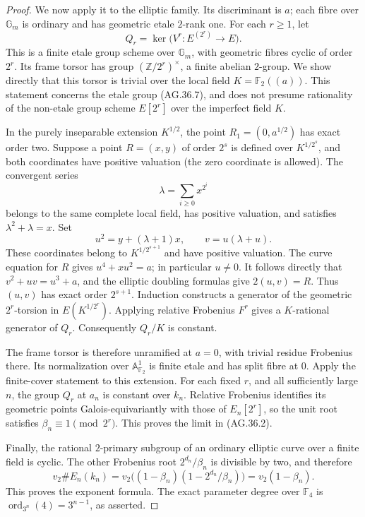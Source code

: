 \begin{proof}
We now apply it to the elliptic family. Its discriminant is
\(a\); each fibre over \(\mathbb G_m\) is ordinary and
has geometric etale \(2\)-rank one. For each \(r\geq1\),
let
\[
 Q_r=\ker\bigl(V^r:E^{(2^r)}\longrightarrow E\bigr).
 \tag{AG.36.7}
\]
This is a finite etale group scheme over \(\mathbb G_m\),
with geometric fibres cyclic of order \(2^r\). Its frame
torsor has group \((\mathbb Z/2^r)^\times\), a finite
abelian \(2\)-group. We show directly that this torsor is
trivial over the local field \(K=\mathbb F_2((a))\).
This statement concerns the etale group (AG.36.7), and does
not presume rationality of the non-etale group scheme
\(E[2^r]\) over the imperfect field \(K\).

In the purely inseparable extension \(K^{1/2}\), the point
\(R_1=(0,a^{1/2})\) has exact order two. Suppose a point
\(R=(x,y)\) of order \(2^s\) is defined over
\(K^{1/2^s}\), and both coordinates have positive valuation
(the zero coordinate is allowed). The convergent series
\[
                  \lambda=\sum_{i\geq0}x^{2^i}
 \tag{AG.36.8}
\]
belongs to the same complete local field, has positive
valuation, and satisfies \(\lambda^2+\lambda=x\).
Set
\[
 u^2=y+(\lambda+1)x,\qquad v=u(\lambda+u).
 \tag{AG.36.9}
\]
These coordinates belong to \(K^{1/2^{s+1}}\) and have
positive valuation. The curve equation for \(R\) gives
\(u^4+xu^2=a\); in particular \(u\ne0\).
It follows directly that \(v^2+uv=u^3+a\), and the
elliptic doubling formulas give \(2(u,v)=R\).
Thus \((u,v)\) has exact order \(2^{s+1}\).
Induction constructs a generator of the geometric
\(2^r\)-torsion in \(E(K^{1/2^r})\).
Applying relative Frobenius \(F^r\) gives a \(K\)-rational
generator of \(Q_r\). Consequently \(Q_r/K\) is constant.

The frame torsor is therefore unramified at \(a=0\),
with trivial residue Frobenius there. Its normalization over
\(\mathbb A^1_{\mathbb F_2}\) is finite etale and has split
fibre at \(0\). Apply the finite-cover statement to this
extension. For each fixed \(r\), and all sufficiently large
\(n\), the group \(Q_r\) at \(a_n\) is constant over
\(k_n\). Relative Frobenius identifies its geometric points
Galois-equivariantly with those of \(E_n[2^r]\), so the
unit root satisfies \(\beta_n\equiv1\pmod{2^r}\).
This proves the limit in (AG.36.2).

Finally, the rational \(2\)-primary subgroup of an ordinary
elliptic curve over a finite field is cyclic. The other
Frobenius root \(2^{d_n}/\beta_n\) is divisible by two,
and therefore
\[
 v_2\#E_n(k_n)
 =v_2\bigl((1-\beta_n)
              (1-2^{d_n}/\beta_n)\bigr)
 =v_2(1-\beta_n).
\]
This proves the exponent formula. The exact parameter degree
over \(\mathbb F_4\) is \(\operatorname{ord}_{3^n}(4)
=3^{n-1}\), as asserted.
\end{proof}


